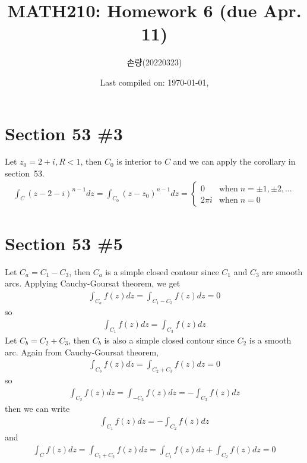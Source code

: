 \documentclass{scrartcl}
\title{MATH210: Homework 6 (due Apr. 11)}
\author{손량(20220323)}
\date{Last compiled on: \today, \currenttime}
\begin{document}
\maketitle

\section{Section 53 \#3}
Let \(z_0 = 2 + i, R < 1\), then \(C_0\) is interior to \(C\) and we can apply the corollary in section~53.
\begin{align*}
  \int_C (z - 2 - i)^{n - 1} dz = \int_{C_0} (z - z_0)^{n - 1} dz = \begin{cases}
    0 & \text{when}\; n = \pm 1, \pm 2, \dots \\
    2\pi i & \text{when}\; n = 0
  \end{cases}
\end{align*}

\section{Section 53 \#5}
Let \(C_a = C_1 - C_3\), then \(C_a\) is a simple closed contour since \(C_1\) and \(C_3\) are smooth arcs.
Applying Cauchy-Goursat theorem, we get
\begin{align*}
  \int_{C_a} f(z) dz = \int_{C_1 - C_3} f(z) dz = 0
\end{align*}
so
\begin{align*}
  \int_{C_1} f(z) dz = \int_{C_3} f(z) dz
\end{align*}
Let \(C_b = C_2 + C_3\), then \(C_b\) is also a simple closed contour since \(C_2\) is a smooth arc.
Again from Cauchy-Goursat theorem,
\begin{align*}
  \int_{C_b} f(z) dz = \int_{C_2 + C_3} f(z) dz = 0
\end{align*}
so
\begin{align*}
  \int_{C_2} f(z) dz = \int_{-C_3} f(z) dz = -\int_{C_3} f(z) dz
\end{align*}
then we can write
\begin{align*}
  \int_{C_1} f(z) dz = -\int_{C_2} f(z) dz
\end{align*}
and
\begin{align*}
  \int_C f(z) dz = \int_{C_1 + C_2} f(z) dz = \int_{C_1} f(z) dz + \int_{C_2} f(z) dz = 0
\end{align*}
\end{document}
